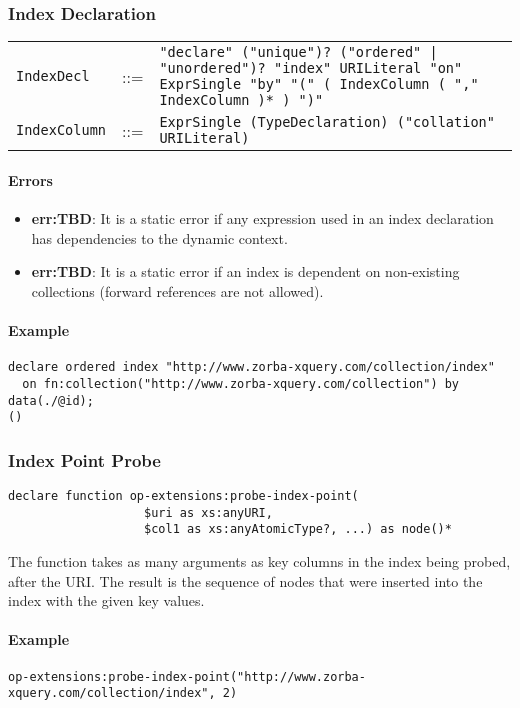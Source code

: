 \documentclass[]{article}
\begin{document}
\subsubsection{Index Declaration}
\begin{tabular}{l c p{12cm}}
{\tt IndexDecl}   & ::= & {\tt "declare" ("unique")? ("ordered" | "unordered")? "index" URILiteral "on" ExprSingle "by" "(" ( IndexColumn ( "," IndexColumn )* ) ")"} \\
{\tt IndexColumn} & ::= & {\tt ExprSingle (TypeDeclaration) ("collation" URILiteral)}
\end{tabular}

\paragraph{Errors}
\begin{itemize}
  \item \textbf{err:TBD}: It is a static error if any expression used in an index declaration has dependencies to the dynamic context.
  \item \textbf{err:TBD}: It is a static error if an index is dependent on non-existing collections (forward references are not allowed).
\end{itemize}

\paragraph{Example}
\begin{verbatim}
declare ordered index "http://www.zorba-xquery.com/collection/index" 
  on fn:collection("http://www.zorba-xquery.com/collection") by data(./@id);
()
\end{verbatim}

\subsubsection{Index Point Probe}
\begin{verbatim}
declare function op-extensions:probe-index-point(
                   $uri as xs:anyURI, 
                   $col1 as xs:anyAtomicType?, ...) as node()*
\end{verbatim}

\noindent
The function takes as many arguments as key columns in the index being probed, after the URI. The result is the sequence of nodes that were inserted into the index with the given key values.

\paragraph{Example}
\begin{verbatim}
op-extensions:probe-index-point("http://www.zorba-xquery.com/collection/index", 2)
\end{verbatim}
\end{document}
